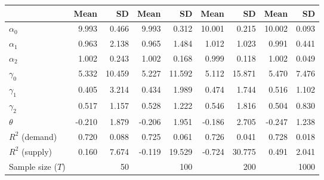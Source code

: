 
\begin{tabular}[t]{lrrrrrrrr}
\toprule
  & Mean & SD & Mean  & SD  & Mean   & SD   & Mean    & SD   \\
\midrule
$\alpha_{0}$ & 9.993 & 0.466 & 9.993 & 0.312 & 10.001 & 0.215 & 10.002 & 0.093\\
$\alpha_{1}$ & 0.963 & 2.138 & 0.965 & 1.484 & 1.012 & 1.023 & 0.991 & 0.441\\
$\alpha_{2}$ & 1.002 & 0.243 & 1.002 & 0.168 & 0.999 & 0.118 & 1.002 & 0.049\\
$\gamma_{0}$ & 5.332 & 10.459 & 5.227 & 11.592 & 5.112 & 15.871 & 5.470 & 7.476\\
$\gamma_{1}$ & 0.405 & 3.214 & 0.434 & 1.989 & 0.474 & 1.744 & 0.516 & 1.102\\
$\gamma_{2}$ & 0.517 & 1.157 & 0.528 & 1.222 & 0.546 & 1.816 & 0.504 & 0.830\\
$\theta$ & -0.210 & 1.879 & -0.206 & 1.951 & -0.186 & 2.705 & -0.247 & 1.238\\
$R^{2}$ (demand) & 0.720 & 0.088 & 0.725 & 0.061 & 0.726 & 0.041 & 0.728 & 0.018\\
$R^{2}$ (supply) & 0.160 & 7.674 & -0.119 & 19.529 & -0.724 & 30.775 & 0.491 & 2.041\\
Sample size ($T$) &  & 50 &  & 100 &  & 200 &  & 1000\\
\bottomrule
\end{tabular}
